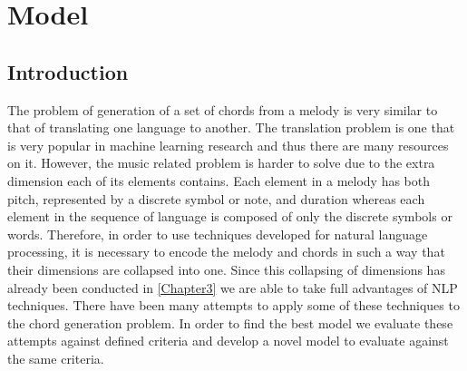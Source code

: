 
\chapter{Model} %

\label{Chapter4} %


\newcommand{\keyword}[1]{\textbf{#1}}
\newcommand{\tabhead}[1]{\textbf{#1}}
\newcommand{\code}[1]{\texttt{#1}}
\newcommand{\file}[1]{\texttt{\bfseries#1}}
\newcommand{\option}[1]{\texttt{\itshape#1}}



\section{Introduction}


The problem of generation of a set of chords from a melody is very similar to that of translating one language to another. 
The translation problem is one that is very popular in machine learning research and thus there are many resources on it.  
However, the music related problem is harder to solve due to the extra dimension each of its elements contains. 
Each element in a melody has both pitch, represented by a discrete symbol or note, and duration whereas each element in the sequence of language is composed of only the discrete symbols or words.  
Therefore, in order to use techniques developed for natural language processing, it is necessary to encode the melody and chords in such a way that their dimensions are collapsed into one. 
Since this collapsing of dimensions has already been conducted in \autoref{Chapter3} we are able to take full advantages of NLP techniques.
There have been many attempts to apply some of these techniques to the chord generation problem. 
In order to find the best model we evaluate these attempts against defined criteria and develop a novel model to evaluate against the same criteria.


